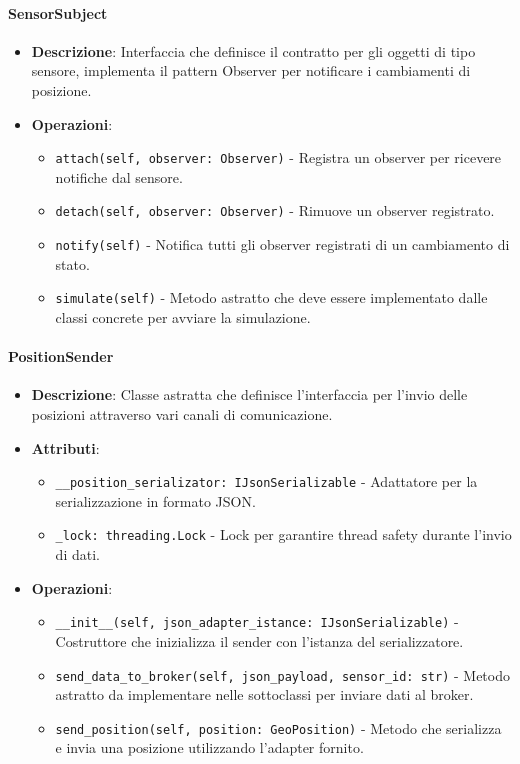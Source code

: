 \documentclass[10pt]{article}
\begin{document}
    \paragraph{SensorSubject}
    \begin{itemize}
        \item \textbf{Descrizione}: Interfaccia che definisce il contratto per gli oggetti di tipo sensore, implementa il pattern Observer per notificare i cambiamenti di posizione.
        \item \textbf{Operazioni}:
        \begin{itemize}
            \item \texttt{attach(self, observer: Observer)} - Registra un observer per ricevere notifiche dal sensore.
            \item \texttt{detach(self, observer: Observer)} - Rimuove un observer registrato.
            \item \texttt{notify(self)} - Notifica tutti gli observer registrati di un cambiamento di stato.
            \item \texttt{simulate(self)} - Metodo astratto che deve essere implementato dalle classi concrete per avviare la simulazione.
        \end{itemize}
    \end{itemize}

    \paragraph{PositionSender}
    \begin{itemize}
        \item \textbf{Descrizione}: Classe astratta che definisce l'interfaccia per l'invio delle posizioni attraverso vari canali di comunicazione.
        \item \textbf{Attributi}:
        \begin{itemize}
            \item \texttt{\_\_position\_serializator: IJsonSerializable} - Adattatore per la serializzazione in formato JSON.
            \item \texttt{\_lock: threading.Lock} - Lock per garantire thread safety durante l'invio di dati.
        \end{itemize}
        \item \textbf{Operazioni}:
        \begin{itemize}
            \item \texttt{\_\_init\_\_(self, json\_adapter\_istance: IJsonSerializable)} - Costruttore che inizializza il sender con l'istanza del serializzatore.
            \item \texttt{send\_data\_to\_broker(self, json\_payload, sensor\_id: str)} - Metodo astratto da implementare nelle sottoclassi per inviare dati al broker.
            \item \texttt{send\_position(self, position: GeoPosition)} - Metodo che serializza e invia una posizione utilizzando l'adapter fornito.
        \end{itemize}
    \end{itemize}
\end{document}
